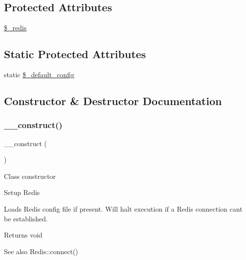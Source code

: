 \subsection*{Protected Attributes}
\begin{DoxyCompactItemize}
\item 
\mbox{\hyperlink{class_c_i___cache__redis_a36de60a8fcbe3efac91a87577d0728de}{\$\+\_\+redis}}
\end{DoxyCompactItemize}
\subsection*{Static Protected Attributes}
\begin{DoxyCompactItemize}
\item 
static \mbox{\hyperlink{class_c_i___cache__redis_afbad69596f851c659fd07255c321fb97}{\$\+\_\+default\+\_\+config}}
\end{DoxyCompactItemize}


\subsection{Constructor \& Destructor Documentation}
\mbox{\label{class_c_i___cache__redis_a095c5d389db211932136b53f25f39685}} 
\subsubsection{\texorpdfstring{\+\_\+\+\_\+construct()}{\_\_construct()}}
{\footnotesize\ttfamily \+\_\+\+\_\+construct (\begin{DoxyParamCaption}{ }\end{DoxyParamCaption})}

Class constructor

Setup Redis

Loads Redis config file if present. Will halt execution if a Redis connection can\textquotesingle{}t be established.

\begin{DoxyReturn}{Returns}
void 
\end{DoxyReturn}
\begin{DoxySeeAlso}{See also}
Redis\+::connect() 
\end{DoxySeeAlso}
\mbox{\label{class_c_i___cache__redis_a421831a265621325e1fdd19aace0c758}} 
